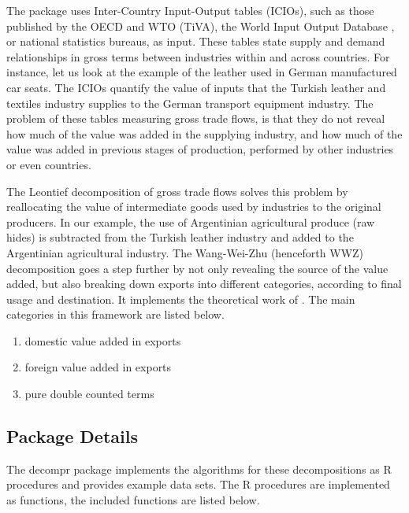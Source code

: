 \documentclass[a4paper]{article}\usepackage[]{graphicx}\usepackage[]{color}
\begin{document}
The package uses Inter-Country Input-Output tables (ICIOs), such as those published by the OECD and WTO (TiVA), %
the World Input Output Database \parencite{timmer2012world},  or national statistics bureaus, as input.
These tables state supply and demand relationships in gross terms between industries within and across countries.
For instance, let us look at the example of the leather used in German manufactured car seats.
The ICIOs quantify the value of inputs that the Turkish leather and textiles industry
supplies to the German transport equipment industry. The problem of these tables measuring gross trade flows, 
is that they do not reveal how much of the value was added in the supplying industry,
and how much of the value was added in previous stages of production, performed by other industries or even countries.

The Leontief decomposition of gross trade flows solves this problem by reallocating the value of intermediate goods used by industries to the original producers.
In our example, the use of Argentinian agricultural produce (raw hides) is subtracted from the Turkish leather industry and added to the Argentinian agricultural industry.
The Wang-Wei-Zhu (henceforth WWZ) decomposition goes a step further by not only revealing the source of the value added,
but also breaking down exports into different categories, according to final usage and destination.
It implements the theoretical work of \textcite{wang2014quantifying}.
The main categories in this framework are listed below.

\begin{enumerate}
 \item domestic value added in exports
 \item foreign value added in exports
 \item pure double counted terms
\end{enumerate}

\subsection{Package Details}
The decompr package implements the algorithms for these decompositions as R procedures and provides example data sets.
The R procedures are implemented as functions, the included functions are listed below.
\end{document}
